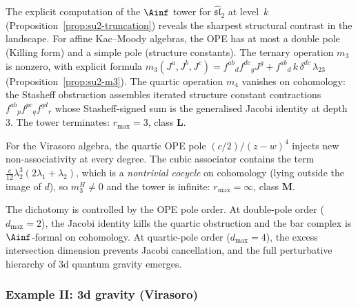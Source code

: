 \begin{remark}
\label{rem:ainf-truncation-dichotomy}
The explicit computation of the $\Ainf$ tower for
$\widehat{\mathfrak{sl}}_2$ at level~$k$
(Proposition~\ref{prop:su2-truncation}) reveals the sharpest
structural contrast in the landscape.
For affine Kac--Moody algebras, the OPE has at most a double pole
(Killing form) and a simple pole (structure constants).
The ternary operation $m_3$ is nonzero, with explicit formula
$m_3(J^a, J^b, J^c) = f^{ab}{}_d f^{dc}{}_g J^g
+ f^{ab}{}_d\, k\, \delta^{dc}\, \lambda_{23}$
(Proposition~\ref{prop:su2-m3}).
The quartic operation $m_4$ vanishes on cohomology: the
Stasheff obstruction assembles iterated structure constant
contractions $f^{ab}{}_p f^{pc}{}_q f^{qd}{}_r$ whose
Stasheff-signed sum is the generalised Jacobi identity at
depth~$3$. The tower terminates:
$r_{\max} = 3$, class $\mathbf{L}$.

For the Virasoro algebra, the quartic OPE pole
$(c/2)/(z-w)^4$ injects new non-associativity at every
degree. The cubic associator contains the term
$\tfrac{c}{12}\lambda_2^3(2\lambda_1 + \lambda_2)$,
which is a \emph{nontrivial cocycle} on cohomology
(lying outside the image of $d$), so
$m_3^H \ne 0$ and the tower is infinite:
$r_{\max} = \infty$, class $\mathbf{M}$.

The dichotomy is controlled by the OPE pole order.
At double-pole order ($d_{\max} = 2$), the Jacobi identity
kills the quartic obstruction and the bar complex is
$\Ainf$-formal on cohomology.
At quartic-pole order ($d_{\max} = 4$), the excess
intersection dimension prevents Jacobi cancellation, and
the full perturbative hierarchy of $3$d quantum gravity
emerges.
\end{remark}


\subsubsection{Example II: 3d gravity (Virasoro)}
\label{subsubsec:platonic-gravity}

